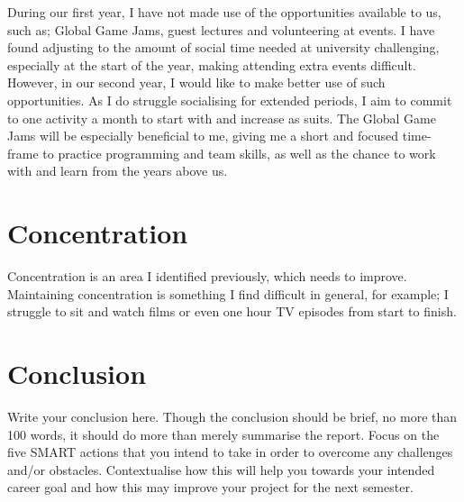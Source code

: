 \documentclass{scrartcl}
\begin{document}
During our first year, I have not made use of the opportunities available to us, such as; Global Game Jams, guest lectures and volunteering at events. I have found adjusting to the amount of social time needed at university challenging, especially at the start of the year, making attending extra events difficult. However, in our second year, I would like to make better use of such opportunities. As I do struggle socialising for extended periods, I aim to commit to one activity a month to start with and increase as suits. The Global Game Jams will be especially beneficial to me, giving me a short and focused time-frame to practice programming and team skills, as well as the chance to work with and learn from the years above us.


\section{Concentration}

Concentration is an area I identified previously, which needs to improve. Maintaining concentration is something I find difficult in general, for example; I struggle to sit and watch films or even one hour TV episodes from start to finish. 


\section{Conclusion}

Write your conclusion here. Though the conclusion should be brief, no more than 100 words, it should do more than merely summarise the report. Focus on the five SMART actions that you intend to take in order to overcome any challenges and/or obstacles. Contextualise how this will help you towards your intended career goal and how this may improve your project for the next semester.



\end{document}
